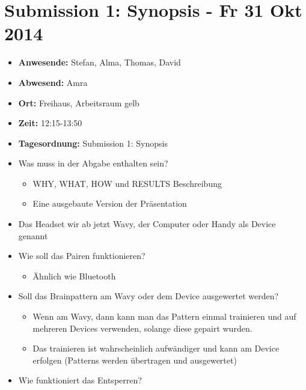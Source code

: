 \section{Submission 1: Synopsis - Fr 31 Okt
2014}\label{submission-1-synopsis---fr-31-okt-2014}

\begin{itemize}
\item
  \textbf{Anwesende:} Stefan, Alma, Thomas, David
\item
  \textbf{Abwesend:} Amra
\item
  \textbf{Ort:} Freihaus, Arbeitsraum gelb
\item
  \textbf{Zeit:} 12:15-13:50
\item
  \textbf{Tagesordnung:} Submission 1: Synopsis
\item
  Was muss in der Abgabe enthalten sein?

  \begin{itemize}
  \itemsep1pt\parskip0pt
  \item
    WHY, WHAT, HOW und RESULTS Beschreibung
  \item
    Eine ausgebaute Version der Präsentation
  \end{itemize}
\item
  Das Headset wir ab jetzt Wavy, der Computer oder Handy als Device
  genannt
\item
  Wie soll das Pairen funktionieren?

  \begin{itemize}
  \itemsep1pt\parskip0pt
  \item
    Ähnlich wie Bluetooth
  \end{itemize}
\item
  Soll das Brainpattern am Wavy oder dem Device ausgewertet werden?

  \begin{itemize}
  \itemsep1pt\parskip0pt
  \item
    Wenn am Wavy, dann kann man das Pattern einmal trainieren und auf
    mehreren Devices verwenden, solange diese gepairt wurden.
  \item
    Das trainieren ist wahrscheinlich aufwändiger und kann am Device
    erfolgen (Patterns werden übertragen und ausgewertet)
  \end{itemize}
\item
  Wie funktioniert das Entsperren?


\end{itemize}
